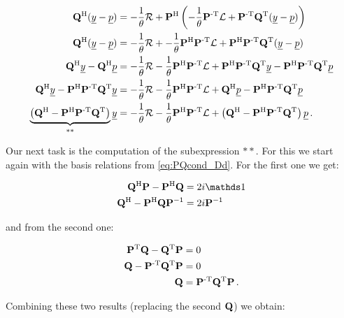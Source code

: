 \begin{align*}
  \mat{Q}\H (\vec{y}-\vec{p}) & = -\frac{1}{\theta} \mathcal{R} +
                                  \mat{P}\H \left(-\frac{1}{\theta}\mat{P}\Tinv\mathcal{L} + \mat{P}\Tinv\mat{Q}\T (\vec{y}-\vec{p}) \right) \\
  \mat{Q}\H (\vec{y}-\vec{p}) & = -\frac{1}{\theta} \mathcal{R} +
                                  -\frac{1}{\theta} \mat{P}\H\mat{P}\Tinv\mathcal{L}
                                  +\mat{P}\H\mat{P}\Tinv\mat{Q}\T (\vec{y}-\vec{p}) \\
  \mat{Q}\H \vec{y} - \mat{Q}\H\vec{p} & = -\frac{1}{\theta} \mathcal{R}
                                           -\frac{1}{\theta} \mat{P}\H\mat{P}\Tinv\mathcal{L}
                                           +\mat{P}\H\mat{P}\Tinv\mat{Q}\T \vec{y}
                                           -\mat{P}\H\mat{P}\Tinv\mat{Q}\T\vec{p} \\
  \mat{Q}\H \vec{y} - \mat{P}\H\mat{P}\Tinv\mat{Q}\T \vec{y}
   & = -\frac{1}{\theta} \mathcal{R}
       -\frac{1}{\theta} \mat{P}\H\mat{P}\Tinv\mathcal{L}
       +\mat{Q}\H\vec{p}
       -\mat{P}\H\mat{P}\Tinv\mat{Q}\T\vec{p} \\
  \underbrace{\left(\mat{Q}\H - \mat{P}\H\mat{P}\Tinv\mat{Q}\T\right)}_{**} \vec{y}
   & = -\frac{1}{\theta} \mathcal{R}
       -\frac{1}{\theta} \mat{P}\H\mat{P}\Tinv\mathcal{L}
       +\left(\mat{Q}\H - \mat{P}\H\mat{P}\Tinv\mat{Q}\T\right)\vec{p} \,.
\end{align*}

Our next task is the computation of the subexpression $**$. For this we start again
with the basis relations from \eqref{eq:PQcond_Dd}. For the first one we get:

\begin{align*}
  \mat{Q}\H \mat{P} - \mat{P}\H \mat{Q} & = 2i \id \\
  \mat{Q}\H - \mat{P}\H \mat{Q} \mat{P}\inv & = 2i \mat{P}\inv \\
\end{align*}

and from the second one:

\begin{align*}
  \mat{P}\T \mat{Q} - \mat{Q}\T \mat{P} & = 0 \\
  \mat{Q} - \mat{P}\Tinv \mat{Q}\T \mat{P} & = 0 \\
  \mat{Q} & = \mat{P}\Tinv \mat{Q}\T \mat{P} \,.
\end{align*}

Combining these two results (replacing the second $\mat{Q}$) we obtain:

